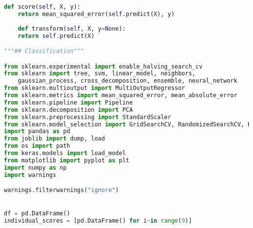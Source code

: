 \begin{lstlisting}[label=python-listing,caption={Kod źródłowy},language=python]
    def score(self, X, y):
    return mean_squared_error(self.predict(X), y)
    
    def transform(self, X, y=None):
    return self.predict(X)

"""## Classification"""

from sklearn.experimental import enable_halving_search_cv 
from sklearn import tree, svm, linear_model, neighbors, 
    gaussian_process, cross_decomposition, ensemble, neural_network
from sklearn.multioutput import MultiOutputRegressor
from sklearn.metrics import mean_squared_error, mean_absolute_error
from sklearn.pipeline import Pipeline
from sklearn.decomposition import PCA
from sklearn.preprocessing import StandardScaler
from sklearn.model_selection import GridSearchCV, RandomizedSearchCV, HalvingGridSearchCV
import pandas as pd
from joblib import dump, load
from os import path
from keras.models import load_model
from matplotlib import pyplot as plt
import numpy as np
import warnings

warnings.filterwarnings("ignore")


df = pd.DataFrame()
individual_scores = [pd.DataFrame() for i~in range(9)]



\end{lstlisting}
